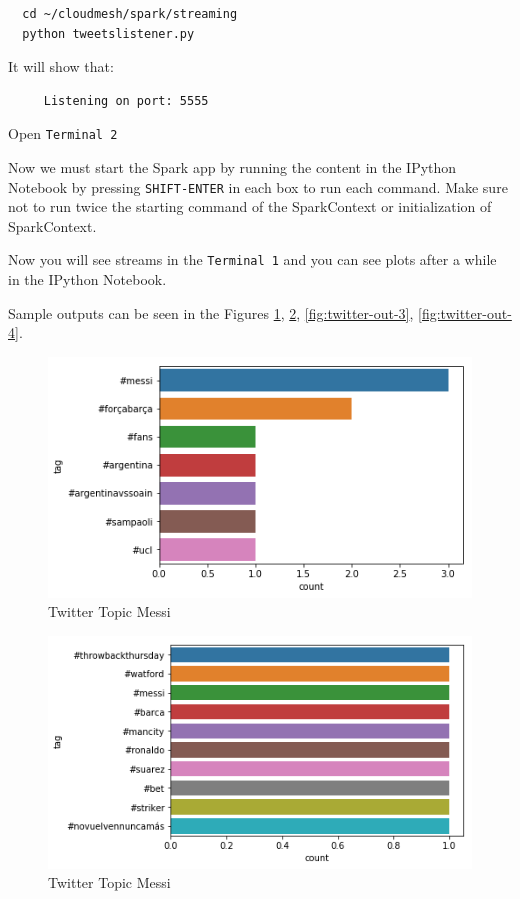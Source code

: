 \begin{lstlisting}
  cd ~/cloudmesh/spark/streaming
  python tweetslistener.py 
\end{lstlisting}

It will show that:

\begin{lstlisting}
     Listening on port: 5555
\end{lstlisting}


Open \verb|Terminal 2|

Now we must start the Spark app by running the content in the IPython Notebook by pressing \verb|SHIFT-ENTER| in each box to run each command.
Make sure not to run twice the starting command of the SparkContext or initialization of SparkContext.

Now you will see streams in the \verb|Terminal 1| and you can see plots after a while in the IPython Notebook.

Sample outputs can be seen in the Figures \ref{fig:twitter-out-1}, \ref{fig:twitter-out-2}, \ref{fig:twitter-out-3}, \ref{fig:twitter-out-4}.

\begin{figure}[htbp]\label{fig:twitter-out-1}
\centering
\includegraphics[width=1.0\textwidth]{images/twitter-messi-3.png}
\caption{Twitter Topic Messi}
\end{figure}


\begin{figure}[htbp]\label{fig:twitter-out-2}
\centering
\includegraphics[width=1.0\textwidth]{images/twitter-messi-5.png}
\caption{Twitter Topic Messi}
\end{figure}

